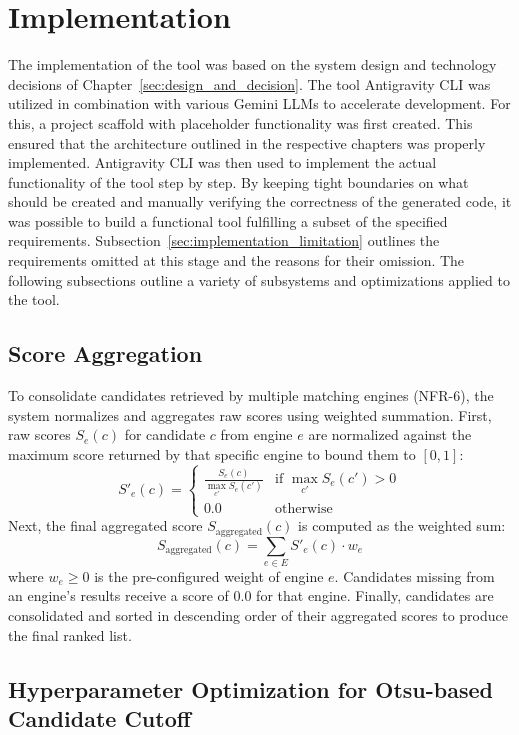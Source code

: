 \section{Implementation}\label{sec:implementation}

The implementation of the tool was based on the system design and technology decisions of Chapter~\ref{sec:design_and_decision}. The tool Antigravity CLI was utilized in combination with various Gemini \acp{LLM} to accelerate development. For this, a project scaffold with placeholder functionality was first created. This ensured that the architecture outlined in the respective chapters was properly implemented. Antigravity CLI was then used to implement the actual functionality of the tool step by step. By keeping tight boundaries on what should be created and manually verifying the correctness of the generated code, it was possible to build a functional tool fulfilling a subset of the specified requirements. Subsection~\ref{sec:implementation_limitation} outlines the requirements omitted at this stage and the reasons for their omission. The following subsections outline a variety of subsystems and optimizations applied to the tool.

\subsection{Score Aggregation}\label{sec:score_aggregation_impl}

To consolidate candidates retrieved by multiple matching engines (NFR-6), the system normalizes and aggregates raw scores using weighted summation. First, raw scores $S_e(c)$ for candidate $c$ from engine $e$ are normalized against the maximum score returned by that specific engine to bound them to $[0, 1]$:
\[
S'_{e}(c) = \begin{cases} 
\frac{S_e(c)}{\max_{c'} S_e(c')} & \text{if } \max_{c'} S_e(c') > 0 \\ 
0.0 & \text{otherwise} 
\end{cases}
\]
Next, the final aggregated score $S_{\text{aggregated}}(c)$ is computed as the weighted sum:
\[
S_{\text{aggregated}}(c) = \sum_{e \in E} S'_{e}(c) \cdot w_e
\]
where $w_e \ge 0$ is the pre-configured weight of engine $e$. Candidates missing from an engine's results receive a score of $0.0$ for that engine. Finally, candidates are consolidated and sorted in descending order of their aggregated scores to produce the final ranked list.

\subsection{Hyperparameter Optimization for Otsu-based Candidate Cutoff}
\label{sec:otsu_optimization}

